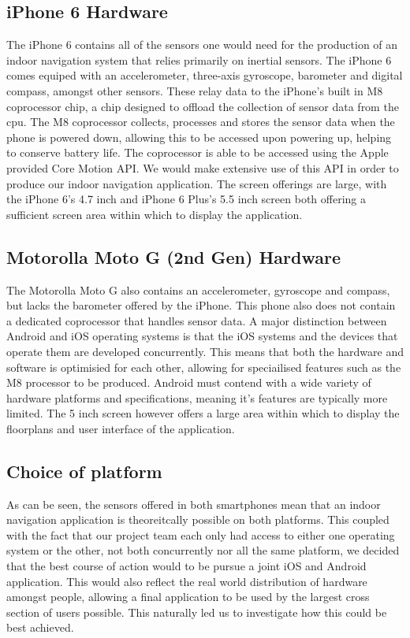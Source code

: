 \documentclass[main.tex]{subfiles}
\begin{document}
\subsection{iPhone 6 Hardware}

The iPhone 6 contains all of the sensors one would need for the production of an indoor navigation system that relies primarily on inertial sensors. The iPhone 6 comes equiped with an accelerometer, three-axis gyroscope, barometer and digital compass, amongst other sensors. These relay data to the iPhone's built in M8 coprocessor chip, a chip designed to offload the collection of sensor data from the cpu. The M8 coprocessor collects, processes and stores the sensor data when the phone is powered down, allowing this to be accessed upon powering up, helping to conserve battery life. The coprocessor is able to be accessed using the Apple provided Core Motion API. We would make extensive use of this API in order to produce our indoor navigation application. The screen offerings are large, with the iPhone 6's 4.7 inch and iPhone 6 Plus's 5.5 inch screen both offering a sufficient screen area within which to display the application.

\subsection{Motorolla Moto G (2nd Gen) Hardware}

The Motorolla Moto G also contains an accelerometer, gyroscope and compass, but lacks the barometer offered by the iPhone. This phone also does not contain a dedicated coprocessor that handles sensor data. A major distinction between Android and iOS operating systems is that the iOS systems and the devices that operate them are developed concurrently. This means that both the hardware and software is optimisied for each other, allowing for speciailised features such as the M8 processor to be produced. Android must contend with a wide variety of hardware platforms and specifications, meaning it's features are typically more limited. The 5 inch screen however offers a large area within which to display the floorplans and user interface of the application.

\subsection{Choice of platform}

As can be seen, the sensors offered in both smartphones mean that an indoor navigation application is theoreitcally possible on both platforms. This coupled with the fact that our project team each only had access to either one operating system or the other, not both concurrently nor all the same platform, we decided that the best course of action would to be pursue a joint iOS and Android application. This would also reflect the real world distribution of hardware amongst people, allowing a final application to be used by the largest cross section of users possible. This naturally led us to investigate how this could be best achieved.
\end{document}
